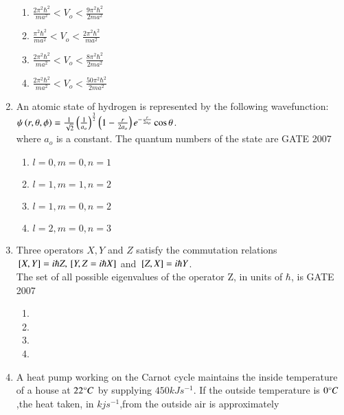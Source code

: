 \documentclass[journal]{IEEEtran}
\begin{document}
\begin{enumerate}
\begin{enumerate}
    \item $\frac{2\pi^2\hbar^2}{ma^2}<V_o< \frac{9\pi^2\hbar^2}{2ma^2} $
     \item $\frac{\pi^2\hbar^2}{ma^2}<V_o< \frac{2\pi^2\hbar^2}{ma^2} $
      \item $\frac{2\pi^2\hbar^2}{ma^2}<V_o< \frac{8\pi^2\hbar^2}{2ma^2} $
       \item $\frac{2\pi^2\hbar^2}{ma^2}<V_o< \frac{50\pi^2\hbar^2}{2ma^2} $
\end{enumerate}
\item An atomic state of hydrogen is represented by the following wavefunction: $\psi\left(r,\theta,\phi\right)= \frac{1}{\sqrt{2}}\left(\frac{1}{a_o}\right)^\frac{3}{2} \left(1-\frac{r}{2a_o}\right)e^{-\frac{r}{2a_o}}\cos{\theta}$.\\
where $a_o$ is a constant. The quantum numbers of the state are
\hfill{GATE 2007}\begin{enumerate}
    \item $l=0,m=0,n=1$
    \item $l=1,m=1,n=2$\item $l=1,m=0,n=2$\item $l=2,m=0,n=3$
\end{enumerate}
\item Three operators $X,Y$ and $Z$ satisfy the commutation relations ${}\left[X,Y\right]=i\hbar Z,{}\left[Y,Z=i\hbar X\right]$ and ${}\left[Z,X\right]=i\hbar Y$.\\
The set of all possible eigenvalues of the operator Z, in units of $\hbar$, is
\hfill{GATE 2007}\begin{enumerate}
    \item {}
    \item {}
    \item 
    \item {}
\end{enumerate}
\item A heat pump working on the Carnot cycle maintains the inside temperature of a house at $22\degree C$ by supplying $450 kJs^{-1}$. If the outside temperature is $0\degree C$,the heat taken, in $kjs^{-1}$,from the outside air is approximately

\end{enumerate}
\end{document}
